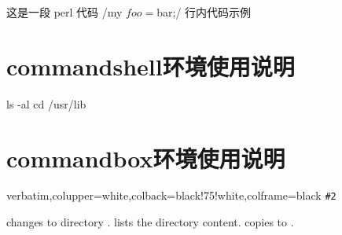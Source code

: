 \documentclass[UTF8, hyperref, fontset = none]{ctexart}
\begin{document}
这是一段 perl 代码 \perlinline/my $foo = $bar;/ 行内代码示例
\section{commandshell环境使用说明}


\begin{commandshell}
	ls -al
	cd /usr/lib
\end{commandshell}
\section{commandbox环境使用说明}
{verbatim,colupper=white,colback=black!75!white,colframe=black}
{%
	\lstinline[language=command.com,keywordstyle=\color{blue!35!white}\bfseries]^#2^}

 changes to directory .
 lists the directory content.
 copies  to
.
\end{document}
